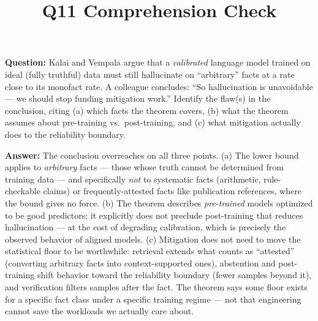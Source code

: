 \documentclass[11pt]{article}
\title{Q11 Comprehension Check}
\date{}
\begin{document}
\maketitle
\textbf{Question:} Kalai and Vempala argue that a \emph{calibrated} language model trained on ideal (fully truthful) data must still hallucinate on ``arbitrary'' facts at a rate close to its monofact rate. A colleague concludes: ``So hallucination is unavoidable --- we should stop funding mitigation work.'' Identify the flaw(s) in the conclusion, citing (a) which facts the theorem covers, (b) what the theorem assumes about pre-training vs.\ post-training, and (c) what mitigation actually does to the reliability boundary.

\vspace{1em}
\textbf{Answer:} The conclusion overreaches on all three points. (a) The lower bound applies to \emph{arbitrary} facts --- those whose truth cannot be determined from training data --- and specifically \emph{not} to systematic facts (arithmetic, rule-checkable claims) or frequently-attested facts like publication references, where the bound gives no force. (b) The theorem describes \emph{pre-trained} models optimized to be good predictors; it explicitly does not preclude post-training that reduces hallucination --- at the cost of degrading calibration, which is precisely the observed behavior of aligned models. (c) Mitigation does not need to move the statistical floor to be worthwhile: retrieval extends what counts as ``attested'' (converting arbitrary facts into context-supported ones), abstention and post-training shift behavior toward the reliability boundary (fewer samples beyond it), and verification filters samples after the fact. The theorem says some floor exists for a specific fact class under a specific training regime --- not that engineering cannot save the workloads we actually care about.
\end{document}
